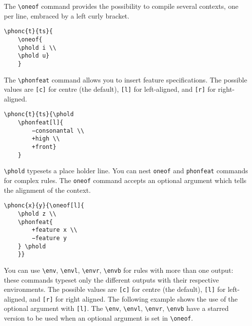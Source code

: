 \documentclass[a4paper]{article}
\begin{document}
The \verb+\oneof+ command provides the possibility to compile several contexts, one per line, embraced by a left curly bracket.

\begin{exe}
\ex
\begin{lstlisting}
\phonc{t}{ts}{
    \oneof{
    \phold i \\
    \phold u}
    }
\end{lstlisting}
\ex {}
\end{exe}

The \verb+\phonfeat+ command allows you to insert feature specifications.
The possible values are \texttt{[c]} for centre (the default), \texttt{[l]} for left-aligned, and \texttt{[r]} for right-aligned. 

\begin{exe}
\ex
\begin{lstlisting}
\phonc{t}{ts}{\phold
    \phonfeat[l]{
        −consonantal \\
        +high \\
        +front}
    }
\end{lstlisting}
\ex {}
\end{exe}

\verb+\phold+ typesets a place holder line. You can nest \verb|oneof| and \verb|phonfeat| commands for complex rules.
The \verb|oneof| command accepts an optional argument which tells the alignment of the context.

\begin{exe}
\ex
\begin{lstlisting}
\phonc{x}{y}{\oneof[l]{
    \phold z \\
    \phonfeat{
        +feature x \\
        −feature y
    } \phold
    }}
\end{lstlisting}
\ex {}
\end{exe}

You can use \verb|\env|, \verb|\envl|, \verb|\envr|, \verb|\envb| for rules with more than one output: these commands typeset only the different outputs with their respective environments.
The possible values are \texttt{[c]} for centre (the default), \texttt{[l]} for left-aligned, and \texttt{[r]} for right aligned.
The following example shows the use of the optional argument with \texttt{[l]}.
The \verb|\env|, \verb|\envl|, \verb|\envr|, \verb|\envb| have a starred version to be used when an optional argument is set in \verb|\oneof|.
\end{document}
